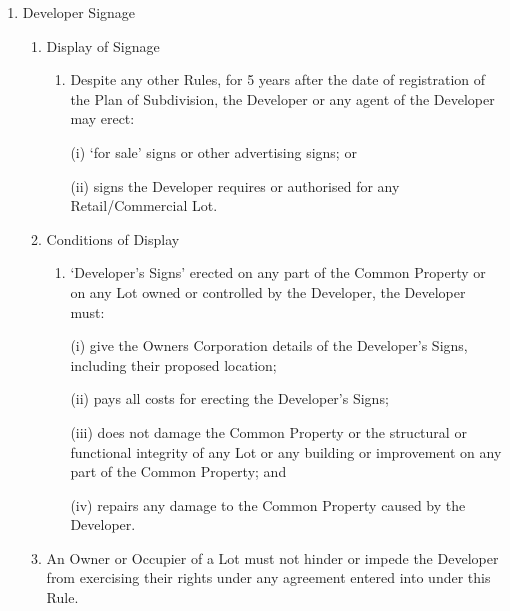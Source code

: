 \documentclass{article}
\begin{document}
\begin{enumerate}[label=\arabic*.]
\begin{enumerate}[label=\arabic{enumi}.\arabic*.]
\begin{enumerate}[label=\arabic{enumi}.\arabic*.]
\begin{enumerate}[label=(\arabic*)]
\item  All Owners must contribute its proportion of the cost incurred by the Owners Corporation in complying with Rule 9.2 relative to the lot liability on the Plan.

\end{enumerate}

\item  Developer Signage

\begin{enumerate}[label=(\arabic*)]

\item  Display of Signage

\begin{enumerate}[label=(\alph*)]

\item  Despite any other Rules, for 5 years after the date of registration of the Plan of Subdivision, the Developer or any agent of the Developer may erect:

(i) ‘for sale’ signs or other advertising signs; or

(ii) signs the Developer requires or authorised for any Retail/Commercial Lot.

\end{enumerate}

\item  Conditions of Display

\begin{enumerate}[label=(\alph*)]

\item  ‘Developer’s Signs’ erected on any part of the Common Property or on any Lot owned or controlled by the Developer, the Developer must:

(i) give the Owners Corporation details of the Developer’s Signs, including their proposed location;

(ii) pays all costs for erecting the Developer’s Signs;

(iii) does not damage the Common Property or the structural or functional integrity of any Lot or any building or improvement on any part of the Common Property; and

(iv) repairs any damage to the Common Property caused by the Developer.

\end{enumerate}

\item  An Owner or Occupier of a Lot must not hinder or impede the Developer from exercising their rights under any agreement entered into under this Rule.


\end{enumerate}
\end{enumerate}
\end{enumerate}
\end{enumerate}
\end{document}
